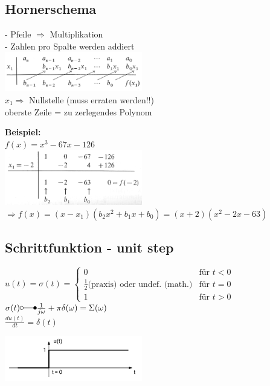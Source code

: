 	
			
\subsection{Hornerschema}
	\begin{minipage}[t]{9cm}
		- Pfeile $\Rightarrow$ Multiplikation\\
		- Zahlen pro Spalte werden addiert\\
		\includegraphics[width=6cm]{./bilder/hornerschema_1.png}\\
		$x_1 \Rightarrow$ Nullstelle (muss erraten werden!!)\\
		oberste Zeile = zu zerlegendes Polynom			
	\end{minipage}
	\begin{minipage}[t]{9cm}
		\textbf{Beispiel:}\\
		$f(x) = x^3-67x-126$\\
		\includegraphics[width=6cm]{./bilder/hornerschema_2.png}\\
		$\Rightarrow f(x) = (x-x_1)(b_2x^2 + b_1x + b_0) = (x+2)(x^2-2x-63)$	
	\end{minipage}

\subsection{Schrittfunktion - unit step}
	\begin{minipage}{10cm}
		$u(t) = \sigma(t) =	\begin{cases}
		  		 0 & \text{für } t < 0 \\
		  		 \frac{1}{2} \text{(praxis)}  \text{ oder undef. (math.)} & \text{für } t = 0 \\
		  		 1 & \text{für } t > 0
		  	\end{cases}
		$
		$\sigma(t) \laplace \frac{1}{j\omega} + \pi\delta(\omega) = \Sigma(\omega)$ \\
		$\frac{du(t)}{dt}=\delta(t)$
	\end{minipage}
	\begin{minipage}{8cm}
		\includegraphics[width=6cm]{./bilder/unitstep.png}
	\end{minipage}

